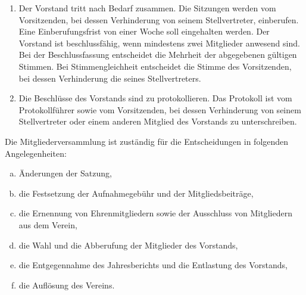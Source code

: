 \documentclass{scrartcl}
\begin{document}
\begin{contract}
\begin{enumerate}
    \item Der Vorstand tritt nach Bedarf zusammen. Die Sitzungen werden vom Vorsitzenden, bei dessen Verhinderung von seinem Stellvertreter, einberufen. Eine Einberufungsfrist von einer Woche soll eingehalten werden. Der Vorstand ist beschlussfähig, wenn mindestens zwei Mitglieder anwesend sind. Bei der Beschlussfassung entscheidet die Mehrheit der abgegebenen gültigen Stimmen. Bei Stimmengleichheit entscheidet die Stimme des Vorsitzenden, bei dessen Verhinderung die seines Stellvertreters.
    \item Die Beschlüsse des Vorstands sind zu protokollieren. Das Protokoll ist vom Protokollführer sowie vom Vorsitzenden, bei dessen Verhinderung von seinem Stellvertreter oder einem anderen Mitglied des Vorstands zu unterschreiben.
\end{enumerate}

Die Mitgliederversammlung ist zuständig für die Entscheidungen in folgenden
Angelegenheiten: 
\begin{enumerate}[(a)]
    \item Änderungen der Satzung,
    \item die Festsetzung der Aufnahmegebühr und der Mitgliedsbeiträge,
    \item die Ernennung von Ehrenmitgliedern sowie der Ausschluss von Mitgliedern aus dem Verein, 
    \item die Wahl und die Abberufung der Mitglieder des Vorstands,
    \item die Entgegennahme des Jahresberichts und die Entlastung des Vorstands,
    \item die Auflösung des Vereins.
\end{enumerate}


\end{contract}
\end{document}
